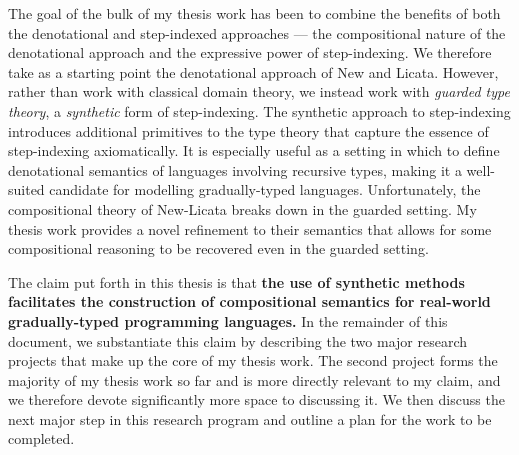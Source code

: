 \documentclass{article}
\theoremstyle{definition}
\theoremstyle{remark}
\begin{document}
The goal of the bulk of my thesis work has been to combine the benefits of both
the denotational and step-indexed approaches --- the compositional nature of the
denotational approach and the expressive power of step-indexing. We therefore
take as a starting point the denotational approach of New and Licata. However,
rather than work with classical domain theory, we instead work with
\emph{guarded type theory}, a \emph{synthetic} form of step-indexing. The
synthetic approach to step-indexing introduces additional primitives to the type
theory that capture the essence of step-indexing axiomatically. It is especially
useful as a setting in which to define denotational semantics of languages
involving recursive types, making it a well-suited candidate for modelling
gradually-typed languages.
%
Unfortunately, the compositional theory of New-Licata breaks down in the guarded
setting.
My thesis work provides a novel refinement to their semantics that allows for
some compositional reasoning to be recovered even in the guarded setting.

The claim put forth in this thesis is that \textbf{the use of synthetic methods
facilitates the construction of compositional semantics for real-world
gradually-typed programming languages.}
%
In the remainder of this document, we substantiate this claim by describing the
two major research projects that make up the core of my thesis work. The second
project forms the majority of my thesis work so far and is more directly
relevant to my claim, and we therefore devote significantly more space to
discussing it. We then discuss the next major step in this research program and
outline a plan for the work to be completed.



\end{document}
